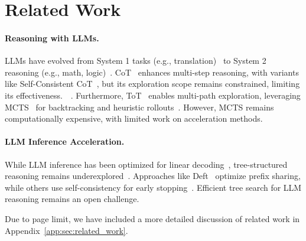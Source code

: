 \section{Related Work}

\paragraph{Reasoning with LLMs. }
LLMs have evolved from System 1 tasks (e.g., translation)~\cite{Brown_2020_Language} to System 2 reasoning (e.g., math, logic)~\cite{Kojima_2022_Large}. CoT~\cite{Wei_2022_Chain} enhances multi-step reasoning, with variants like Self-Consistent CoT~\cite{wang2022self}, but its exploration scope remains constrained, limiting its effectiveness.~~\cite{chu2023survey}.
Furthermore, ToT~\cite{Yao_2023_Tree} enables multi-path exploration, leveraging MCTS~\cite{chaslot2008monte} for backtracking and heuristic rollouts~\cite{wan2024alphazero,wang2024q}. However, MCTS remains computationally expensive, with limited work on acceleration methods.

\paragraph{LLM Inference Acceleration. }
While LLM inference has been optimized for linear decoding~\cite{lin2024awq}, tree-structured reasoning remains underexplored~\cite{li2024large}. Approaches like Deft~\cite{yao2024deft} optimize prefix sharing, while others use self-consistency for early stopping~\cite{li2024escape}. Efficient tree search for LLM reasoning remains an open challenge.

Due to page limit, we have included a more detailed discussion of related work 
in Appendix~\ref{app:sec:related_work}. 